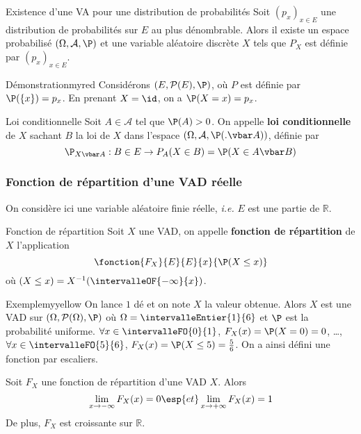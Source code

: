     \begin{theo}{Existence d’une VA pour une distribution de probabilités}
        Soit $(p_x)_{x \in E}$ une distribution de probabilités sur $E$ au plus dénombrable. Alors il existe un espace probabilisé $(\Omega, \mathcal{A}, \P)$ et une variable aléatoire discrète $X$ tels que $P_X$ est définie par $(p_x)_{x \in E}$.
    \end{theo}

    \begin{demo}{Démonstration}{myred}
        Considérons $(E, \mathcal{P}(E), \P)$, où $P$ est définie par $\P(\left\{x\right\}) = p_x$. En prenant $X = \id$, on a $\P(X = x) = p_x$.
    \end{demo}

    \begin{defi}{Loi conditionnelle}{}
        Soit $A \in \mathcal{A}$ tel que $\P(A) > 0$. On appelle \textbf{loi conditionnelle} de $X$ sachant $B$ la loi de $X$ dans l’espace $(\Omega, \mathcal{A}, \P(. \vbar A))$, définie par 
        \[ \P_{X \vbar A} : B \in E \to P_A(X \in B) = \P(X \in A \vbar B) \]    
    \end{defi}

    \subsubsection{Fonction de répartition d’une VAD réelle}

    On considère ici une variable aléatoire finie réelle, \textit{i.e.} $E$ est une partie de $\mathbb{R}$.

    \begin{defi}{Fonction de répartition}{}
        Soit $X$ une VAD, on appelle \textbf{fonction de répartition} de $X$ l’application 
        \[ \fonction{F_X}{E}{E}{x}{\P(X \leq x)} \] 
        où $(X \leq x) = X^{-1}(\intervalleOF{-\infty}{x})$.
    \end{defi}

    \begin{omed}{Exemple}{myyellow}
        On lance $1$ dé et on note $X$ la valeur obtenue. Alors $X$ est une VAD sur $(\Omega, \mathcal{P}(\Omega), \P)$ où $\Omega = \intervalleEntier{1}{6}$ et $\P$ est la probabilité uniforme. $\forall x \in \intervalleFO{0}{1}$, $F_X(x) = \P(X = 0) = 0$, \ldots, $\forall x \in \intervalleFO{5}{6}$, $F_X(x) = \P(X \leq 5) = \frac{5}{6}$. On a ainsi défini une fonction par escaliers.
    \end{omed}

    \begin{prop}{}{}
        Soit $F_X$ une fonction de répartition d’une VAD $X$. Alors 
        \[ \lim_{x \to -\infty} F_X(x) = 0 \esp{et} \lim_{x \to +\infty} F_X(x) = 1 \]    
        De plus, $F_X$ est croissante sur $\mathbb{R}$.
    \end{prop}

